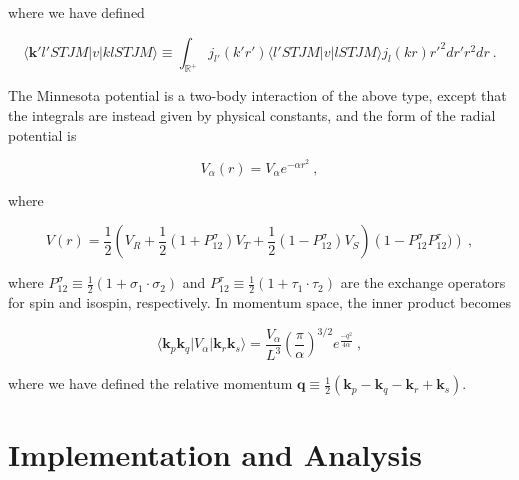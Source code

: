 \documentclass[10pt,twoside]{report}
\begin{document}
	\noindent where we have defined
	
	\begin{equation}
		\langle \bm{k}'l'STJM|v|klSTJM\rangle \equiv \int_{\mathbb{R}^+}j_{l'}(k'r') \langle l'STJM|v|lSTJM\rangle j_l(kr)r'^2 dr' r^2dr\:.
	\end{equation}
	
	The Minnesota potential is a two-body interaction of the above type, except that the integrals are instead given by physical constants, and the form of the radial potential is
	
	\begin{equation}
		V_\alpha(r) = V_\alpha e^{-\alpha r^2} \:,
	\end{equation}
	
	\noindent where
	
	\begin{equation}
		V(r) = \frac{1}{2}\left( V_R + \frac{1}{2}(1+P_{12}^\sigma)V_T + \frac{1}{2}(1-P_{12}^\sigma)V_S\right)\left(1 - P_{12}^\sigma P_{12}^\tau)\right) \:,
		\label{Int.Nucl.Mat | eq | "Minnesota potential"}
	\end{equation}
	
	\noindent where $P_{12}^\sigma \equiv \frac{1}{2}(1+\sigma_1\cdot\sigma_2)$ and $P_{12}^\tau \equiv \frac{1}{2}(1+\tau_1\cdot\tau_2)$ are the exchange operators for spin and isospin, respectively. In momentum space, the inner product becomes
	
	\begin{equation}
		\langle \bm{k}_p\bm{k}_q|V_\alpha|\bm{k}_r\bm{k}_s\rangle = \frac{V_\alpha}{L^3}\left(\frac{\pi}{\alpha}\right)^{3/2}e^{\frac{-q^2}{4\alpha}} \:,
	\end{equation}
	
	\noindent where we have defined the relative momentum $\bm{q} \equiv \frac{1}{2}(\bm{k}_p-\bm{k}_q-\bm{k}_r+\bm{k}_s)$.
	
	\part{Implementation and Analysis}
	
\end{document}
